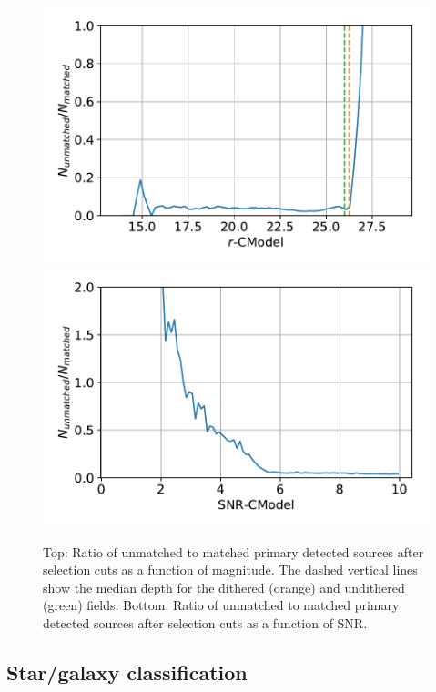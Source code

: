 \documentclass[twocolumn]{aastex62}
\begin{document}
\begin{figure}
\centering
\includegraphics[width=0.9\columnwidth]{unmatched_fraction_magnitude.pdf}
\includegraphics[width=0.9\columnwidth]{unmatched_fraction_SNR.pdf}
\caption{Top: Ratio of unmatched to matched primary detected sources after selection cuts as a function of magnitude. The dashed vertical lines show the median depth for the dithered (orange) and undithered (green) fields. Bottom: Ratio of unmatched to matched primary detected sources after selection cuts as a function of SNR.}
\label{fig:snr_mag_selection}
\end{figure}

\subsection{Star/galaxy classification}
\end{document}
